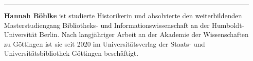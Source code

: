 \documentclass[a4paper,
fontsize=11pt,
oneside,
numbers=noperiodatend,
parskip=half-,
bibliography=totoc,
final
]{scrartcl}
\begin{document}
\begin{center}\rule{0.5\linewidth}{0.5pt}\end{center}

\textbf{Hannah Böhlke} ist studierte Historikerin und absolvierte den weiterbildenden Masterstudiengang Bibliotheks- und Informationswissenschaft an der Humboldt-Universität Berlin. Nach langjähriger Arbeit an der Akademie der Wissenschaften zu Göttingen ist sie seit 2020 im Universitätsverlag der Staats- und Universitätsbibliothek Göttingen beschäftigt.
\end{document}
